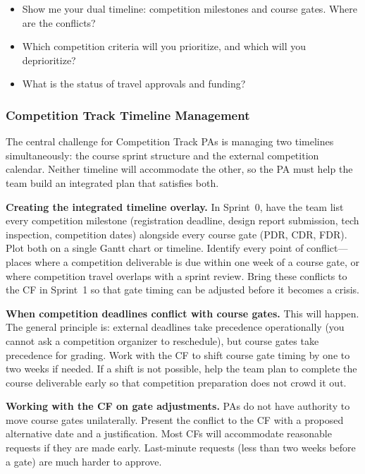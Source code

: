\begin{paquestion}
\begin{itemize}[nosep,leftmargin=1.5em]
\item Show me your dual timeline: competition milestones and course gates. Where are the conflicts?
\item Which competition criteria will you prioritize, and which will you deprioritize?
\item What is the status of travel approvals and funding?
\end{itemize}
\end{paquestion}

\subsubsection{Competition Track Timeline Management}

The central challenge for Competition Track PAs is managing two timelines simultaneously: the course sprint structure and the external competition calendar. Neither timeline will accommodate the other, so the PA must help the team build an integrated plan that satisfies both.

\textbf{Creating the integrated timeline overlay.} In Sprint~0, have the team list every competition milestone (registration deadline, design report submission, tech inspection, competition dates) alongside every course gate (PDR, CDR, FDR). Plot both on a single Gantt chart or timeline. Identify every point of conflict---places where a competition deliverable is due within one week of a course gate, or where competition travel overlaps with a sprint review. Bring these conflicts to the CF in Sprint~1 so that gate timing can be adjusted before it becomes a crisis.

\textbf{When competition deadlines conflict with course gates.} This will happen. The general principle is: external deadlines take precedence operationally (you cannot ask a competition organizer to reschedule), but course gates take precedence for grading. Work with the CF to shift course gate timing by one to two weeks if needed. If a shift is not possible, help the team plan to complete the course deliverable early so that competition preparation does not crowd it out.

\textbf{Working with the CF on gate adjustments.} PAs do not have authority to move course gates unilaterally. Present the conflict to the CF with a proposed alternative date and a justification. Most CFs will accommodate reasonable requests if they are made early. Last-minute requests (less than two weeks before a gate) are much harder to approve.

